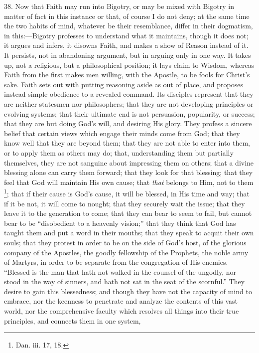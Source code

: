 38. Now that Faith may run into Bigotry, or may be mixed with
Bigotry in matter of fact in this instance or that, of course I do not
deny; at the same time the two habits of mind, whatever be their
resemblance, differ in their dogmatism, in this:—Bigotry professes
to understand what it maintains, though it does not; it argues and
infers, it disowns Faith, and makes a show of Reason instead of it. It
persists, not in abandoning argument, but in arguing only in one way.
It takes up, not a religious, but a philosophical position; it lays
claim to Wisdom, whereas Faith from the first makes men willing, with
the Apostle, to be fools for Christ's sake. Faith sets out with
putting reasoning aside as out of place, and proposes instead simple
obedience to a revealed command. Its disciples represent that they are
neither statesmen nor philosophers; that they are not developing
principles or evolving systems; that their ultimate end is not
persuasion, popularity, or success; that they are but doing God's
will, and desiring His glory. They profess a sincere belief that
certain views which engage their minds come from God; that they know
well that they are beyond them; that they are not able to enter into
them, or to apply them as others may do; that, understanding them but
partially themselves, they are not sanguine about impressing them on
others; that a divine blessing alone can carry them forward; that they
look for that blessing; that they feel that God will maintain His own
cause; that \emph{that} belongs to Him, not to them \footnote{Dan. iii. 17, 18.};
that if their cause is God's cause, it will be blessed, in His time
and way; that if it be not, it will come to nought; that they securely
wait the issue; that they leave it to the generation to come; that
they can bear to seem to fail, but cannot bear to be ``disobedient
to a heavenly vision;'' that they think that God has taught them
and put a word in their mouths; that they speak to acquit their own
souls; that they protest in order to be on the side of God's host, of
the glorious company of the Apostles, the goodly fellowship of the
Prophets, the noble army of Martyrs, in order to be separate from the
congregation of His enemies. ``Blessed is the man that hath not
walked in the counsel of the ungodly, nor stood in the way of sinners,
and hath not sat in the seat of the scornful.'' They desire to
gain this blessedness; and though they have not the capacity of mind
to embrace, nor the keenness to penetrate and analyze the contents of
this vast world, nor the comprehensive faculty which resolves all
things into their true principles, and connects them in one system,
